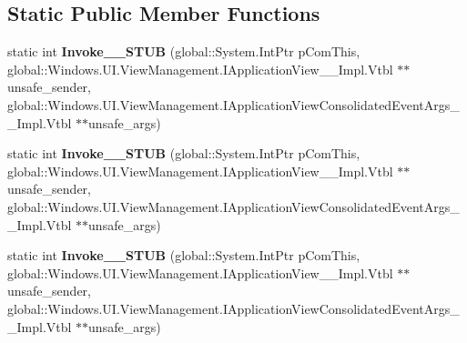 \subsection*{Static Public Member Functions}
\begin{DoxyCompactItemize}
\item 
\mbox{\label{struct_windows_1_1_foundation_1_1_typed_event_handler___a___windows___u_i___view_management___ap72530f67d076325c92c48b027e090fa9_a2ce63d428c6a4dcab040c43ee47d14a1}} 
static int {\bfseries Invoke\+\_\+\+\_\+\+S\+T\+UB} (global\+::\+System.\+Int\+Ptr p\+Com\+This, global\+::\+Windows.\+U\+I.\+View\+Management.\+I\+Application\+View\+\_\+\+\_\+\+Impl.\+Vtbl $\ast$$\ast$unsafe\+\_\+sender, global\+::\+Windows.\+U\+I.\+View\+Management.\+I\+Application\+View\+Consolidated\+Event\+Args\+\_\+\+\_\+\+Impl.\+Vtbl $\ast$$\ast$unsafe\+\_\+args)
\item 
\mbox{\label{struct_windows_1_1_foundation_1_1_typed_event_handler___a___windows___u_i___view_management___ap72530f67d076325c92c48b027e090fa9_a2ce63d428c6a4dcab040c43ee47d14a1}} 
static int {\bfseries Invoke\+\_\+\+\_\+\+S\+T\+UB} (global\+::\+System.\+Int\+Ptr p\+Com\+This, global\+::\+Windows.\+U\+I.\+View\+Management.\+I\+Application\+View\+\_\+\+\_\+\+Impl.\+Vtbl $\ast$$\ast$unsafe\+\_\+sender, global\+::\+Windows.\+U\+I.\+View\+Management.\+I\+Application\+View\+Consolidated\+Event\+Args\+\_\+\+\_\+\+Impl.\+Vtbl $\ast$$\ast$unsafe\+\_\+args)
\item 
\mbox{\label{struct_windows_1_1_foundation_1_1_typed_event_handler___a___windows___u_i___view_management___ap72530f67d076325c92c48b027e090fa9_a2ce63d428c6a4dcab040c43ee47d14a1}} 
static int {\bfseries Invoke\+\_\+\+\_\+\+S\+T\+UB} (global\+::\+System.\+Int\+Ptr p\+Com\+This, global\+::\+Windows.\+U\+I.\+View\+Management.\+I\+Application\+View\+\_\+\+\_\+\+Impl.\+Vtbl $\ast$$\ast$unsafe\+\_\+sender, global\+::\+Windows.\+U\+I.\+View\+Management.\+I\+Application\+View\+Consolidated\+Event\+Args\+\_\+\+\_\+\+Impl.\+Vtbl $\ast$$\ast$unsafe\+\_\+args)

\end{DoxyCompactItemize}
